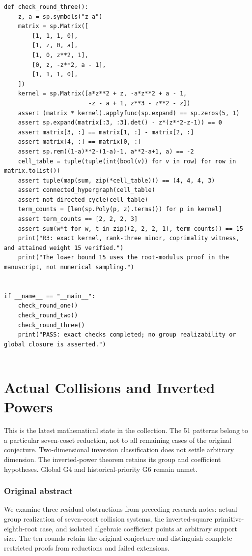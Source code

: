 \documentclass[11pt,a4paper,oneside]{report}
\theoremstyle{definition}
\theoremstyle{remark}
\newcommand{\compilationnote}[1]{\medskip\noindent{\small\color{accent}\textbf{Compilation note --- 23 November 2026.}}\par
{\small #1}\par\medskip}
\begin{document}
\begin{lstlisting}
def check_round_three():
    z, a = sp.symbols("z a")
    matrix = sp.Matrix([
        [1, 1, 1, 0],
        [1, z, 0, a],
        [1, 0, z**2, 1],
        [0, z, -z**2, a - 1],
        [1, 1, 1, 0],
    ])
    kernel = sp.Matrix([a*z**2 + z, -a*z**2 + a - 1,
                        -z - a + 1, z**3 - z**2 - z])
    assert (matrix * kernel).applyfunc(sp.expand) == sp.zeros(5, 1)
    assert sp.expand(matrix[:3, :3].det() - z*(z**2-z-1)) == 0
    assert matrix[3, :] == matrix[1, :] - matrix[2, :]
    assert matrix[4, :] == matrix[0, :]
    assert sp.rem((1-a)**2-(1-a)-1, a**2-a+1, a) == -2
    cell_table = tuple(tuple(int(bool(v)) for v in row) for row in matrix.tolist())
    assert tuple(map(sum, zip(*cell_table))) == (4, 4, 4, 3)
    assert connected_hypergraph(cell_table)
    assert not directed_cycle(cell_table)
    term_counts = [len(sp.Poly(p, z).terms()) for p in kernel]
    assert term_counts == [2, 2, 2, 3]
    assert sum(w*t for w, t in zip((2, 2, 2, 1), term_counts)) == 15
    print("R3: exact kernel, rank-three minor, coprimality witness, and attained weight 15 verified.")
    print("The lower bound 15 uses the root-modulus proof in the manuscript, not numerical sampling.")


if __name__ == "__main__":
    check_round_one()
    check_round_two()
    check_round_three()
    print("PASS: exact checks completed; no group realizability or global closure is asserted.")


\end{lstlisting}


\clearpage





\chapter{Actual Collisions and Inverted Powers}\label{chap:M13}
\par
\compilationnote{This is the latest mathematical state in the collection. The 51
patterns belong to a particular seven-coset reduction, not to all
remaining cases of the original conjecture. Two-dimensional inversion
classification does not settle arbitrary dimension. The inverted-power
theorem retains its group and coefficient hypotheses.
Global G4 and historical-priority G6 remain unmet.}
\subsection*{Original abstract}
We examine three residual obstructions from preceding research notes:
actual group realization of seven-coset collision systems, the
inverted-square primitive-eighth-root case, and isolated algebraic
coefficient points at arbitrary support size. The ten rounds retain
the original conjecture and distinguish complete restricted proofs
from reductions and failed extensions.
\end{document}
